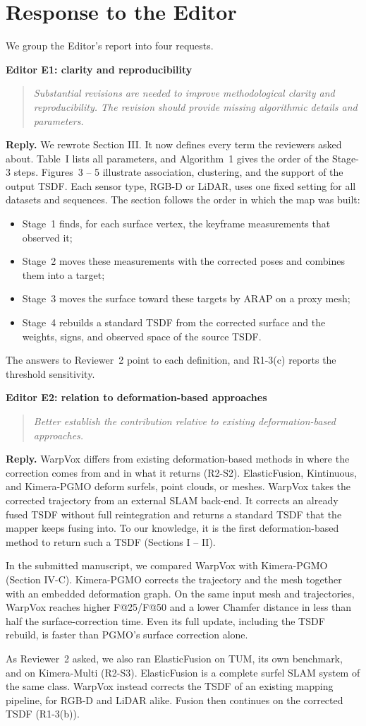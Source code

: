 \documentclass[11pt,a4paper]{article}
\newcommand{\point}[2]{\par\medskip\textbf{#1}\par\begin{quote}\itshape #2\end{quote}}
\newenvironment{reply}{\begingroup\color{replyblue}\textbf{Reply.} }{\par\endgroup}
\begin{document}
\section*{Response to the Editor}
We group the Editor's report into four requests.
\point{Editor E1: clarity and reproducibility}{Substantial revisions are needed to improve methodological clarity and reproducibility. The revision should provide missing algorithmic details and parameters.}
\begin{reply}
We rewrote Section III. It now defines every term the reviewers asked about. Table~I lists all parameters, and Algorithm~1 gives the order of the Stage-3 steps. Figures~3 -- 5 illustrate association, clustering, and the support of the output TSDF. Each sensor type, RGB-D or LiDAR, uses one fixed setting for all datasets and sequences. The section follows the order in which the map was built:
\begin{itemize}[leftmargin=*,topsep=2pt,itemsep=2pt]
\item Stage~1 finds, for each surface vertex, the keyframe measurements that observed it;
\item Stage~2 moves these measurements with the corrected poses and combines them into a target;
\item Stage~3 moves the surface toward these targets by ARAP on a proxy mesh;
\item Stage~4 rebuilds a standard TSDF from the corrected surface and the weights, signs, and observed space of the source TSDF.
\end{itemize}
The answers to Reviewer~2 point to each definition, and R1-3(c) reports the threshold sensitivity.
\end{reply}
\point{Editor E2: relation to deformation-based approaches}{Better establish the contribution relative to existing deformation-based approaches.}
\begin{reply}
WarpVox differs from existing deformation-based methods in where the correction comes from and in what it returns (R2-S2). ElasticFusion, Kintinuous, and Kimera-PGMO deform surfels, point clouds, or meshes. WarpVox takes the corrected trajectory from an external SLAM back-end. It corrects an already fused TSDF without full reintegration and returns a standard TSDF that the mapper keeps fusing into. To our knowledge, it is the first deformation-based method to return such a TSDF (Sections I -- II).

In the submitted manuscript, we compared WarpVox with Kimera-PGMO (Section IV-C). Kimera-PGMO corrects the trajectory and the mesh together with an embedded deformation graph. On the same input mesh and trajectories, WarpVox reaches higher F@25/F@50 and a lower Chamfer distance in less than half the surface-correction time. Even its full update, including the TSDF rebuild, is faster than PGMO's surface correction alone.

As Reviewer~2 asked, we also ran ElasticFusion on TUM, its own benchmark, and on Kimera-Multi (R2-S3). ElasticFusion is a complete surfel SLAM system of the same class. WarpVox instead corrects the TSDF of an existing mapping pipeline, for RGB-D and LiDAR alike. Fusion then continues on the corrected TSDF (R1-3(b)).
\end{reply}
\end{document}
